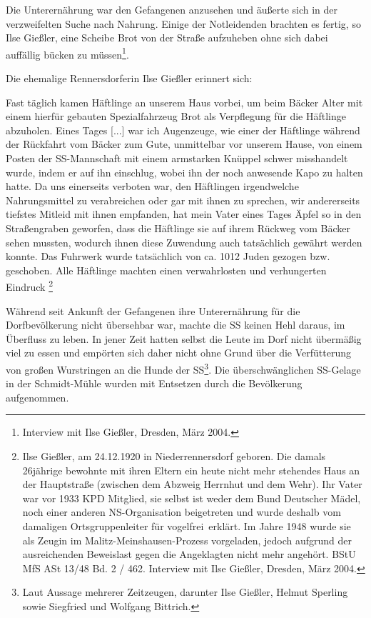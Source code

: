 Die Unterernährung war den Gefangenen anzusehen und äußerte sich in der verzweifelten Suche nach Nahrung. Einige der Notleidenden brachten es fertig, so Ilse Gießler, eine Scheibe Brot von der Straße aufzuheben ohne sich dabei auffällig bücken zu müssen\footnote{Interview mit Ilse Gießler, Dresden, März 2004.}. 

Die ehemalige Rennersdorferin Ilse Gießler erinnert sich:
\begin{leftbar} 
Fast täglich kamen Häftlinge an unserem Haus vorbei, um beim Bäcker Alter mit einem hierfür gebauten Spezialfahrzeug Brot als Verpflegung für die Häftlinge abzuholen. Eines Tages {[}...{]} war ich Augenzeuge, wie einer der Häftlinge während der Rückfahrt vom Bäcker zum Gute, unmittelbar vor unserem Hause, von einem Posten der SS-Mannschaft mit einem armstarken Knüppel schwer misshandelt wurde, indem er auf ihn einschlug, wobei ihn der noch anwesende Kapo zu halten hatte. Da uns einerseits verboten war, den Häftlingen irgendwelche Nahrungsmittel zu verabreichen oder gar mit ihnen zu sprechen, wir andererseits tiefstes Mitleid mit ihnen empfanden, hat mein Vater eines Tages Äpfel so in den Straßengraben geworfen, dass die Häftlinge sie auf ihrem Rückweg vom Bäcker sehen mussten, wodurch ihnen diese Zuwendung auch tatsächlich gewährt werden konnte. Das Fuhrwerk wurde tatsächlich von ca. 10\textendash{}12 Juden gezogen bzw. geschoben. Alle Häftlinge machten einen verwahrlosten und verhungerten Eindruck
\footnote{Ilse Gießler, am 24.12.1920 in Niederrennersdorf geboren. Die damals 26jährige bewohnte mit ihren Eltern ein heute nicht mehr stehendes Haus an der Hauptstraße (zwischen dem Abzweig Herrnhut und dem Wehr). Ihr Vater war vor 1933 KPD Mitglied, sie selbst ist weder dem Bund Deutscher Mädel, noch einer anderen NS-Organisation beigetreten und wurde deshalb vom damaligen Ortsgruppenleiter für \glqq vogelfrei\grqq~erklärt. Im Jahre 1948 wurde sie als Zeugin im Malitz-Meinshausen-Prozess vorgeladen, jedoch aufgrund der ausreichenden Beweislast gegen die Angeklagten nicht mehr angehört. BStU MfS ASt 13/48 Bd. 2 / 462. Interview mit Ilse Gießler, Dresden, März 2004.} 
\end{leftbar}


Während seit Ankunft der Gefangenen ihre Unterernährung für die Dorfbevölkerung nicht übersehbar war, machte die SS keinen Hehl daraus, im Überfluss zu leben. In jener Zeit hatten selbst die Leute im Dorf nicht übermäßig viel zu essen und empörten sich daher nicht ohne Grund über die Verfütterung von großen Wurstringen an die Hunde der SS\footnote{Laut Aussage mehrerer Zeitzeugen, darunter Ilse Gießler, Helmut Sperling sowie Siegfried und Wolfgang Bittrich.}. Die überschwänglichen SS-Gelage in der Schmidt-Mühle wurden mit Entsetzen durch die Bevölkerung aufgenommen.


